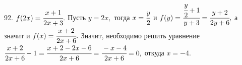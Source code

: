 92. $f(2x)=\cfrac{x+1}{2x+3}.$ Пусть $y=2x,$ тогда $x=\cfrac{y}{2}$ и $f(y)=\cfrac{\cfrac{y}{2}+1}{y+3}=\cfrac{y+2}{2y+6},$ а значит и
$f(x)=\cfrac{x+2}{2x+6}.$ Значит, необходимо решить уравнение
$\cfrac{x+2}{2x+6}-1=\cfrac{x+2-2x-6}{2x+6}=\cfrac{-x-4}{2x+6}=0,$ откуда $x=-4.$\\
